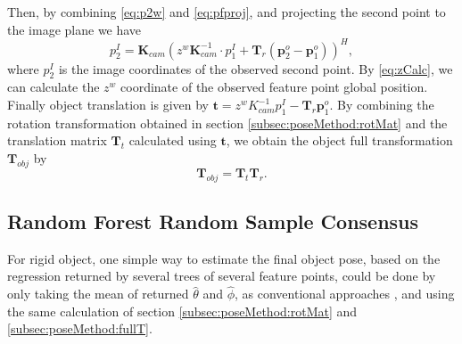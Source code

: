 \documentclass[annual]{acmsiggraph}
\begin{document}
Then, by combining \eqref{eq:p2w} and \eqref{eq:pfproj}, and projecting the second point to the image plane we have
\begin{equation}
p_2^I = \mathbf{K}_{cam}(z^w \mathbf{K}^{-1}_{cam}\cdot p^I_1 + \mathbf{T}_{r}(\mathbf{p}^o_2 - \mathbf{p}^o_1))^H,
\label{eq:zCalc}
\end{equation} 	  
where $p_2^I$ is the image coordinates of the observed second point. By \eqref{eq:zCalc}, we can calculate the $z^w$ coordinate of the observed feature point global position. Finally object translation is given by $\mathbf{t} = z^wK^{-1}_{cam}p^I_1 - \mathbf{T}_r \mathbf{p}^o_1$. By combining the rotation transformation obtained in section \ref{subsec:poseMethod:rotMat} and the translation matrix $\mathbf{T}_t$ calculated using $\mathbf{t}$, we obtain the object full transformation $\mathbf{T}_{obj}$ by
\begin{equation}
\mathbf{T}_{obj} = \mathbf{T}_t\mathbf{T}_r.
\label{eq:Tobj}
\end{equation}
 

\subsection{Random Forest Random Sample Consensus}
\label{subsec:poseMethod:rfRANSAC}

	


For rigid object, one simple way to estimate the final object pose, based on the regression returned by several trees of several feature points, could be done by only taking the mean of returned $\hat{\theta}$ and $\hat{\phi}$, as conventional approaches \cite{Criminisi:Book}, and using the same calculation of section \ref{subsec:poseMethod:rotMat} and \ref{subsec:poseMethod:fullT}.
\end{document}
